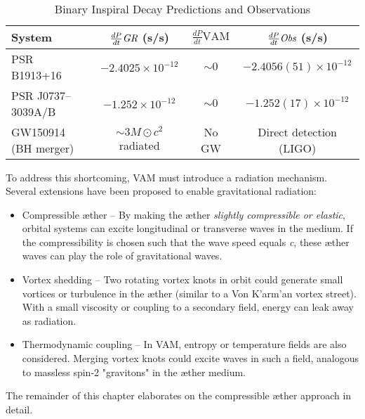 \begin{table}[h!]
\centering
\caption{Binary Inspiral Decay Predictions and Observations}
\label{tab:gw_comparison}
\begin{tabular}{lccc}
\toprule
System & $\frac{dP}{dt}\textit{\text{GR}}$ (s/s) & $\frac{dP}{dt}\text{VAM}$ & $\frac{dP}{dt}\textit{\text{Obs}}$ (s/s) \\
\midrule
PSR B1913+16 & $-2.4025\times10^{-12}$ & $\sim 0$ & $-2.4056(51)\times10^{-12}$ \\
PSR J0737--3039A/B & $-1.252\times10^{-12}$ & $\sim 0$ & $-1.252(17)\times10^{-12}$ \\
GW150914 (BH merger) & $\sim 3M\odot c^2$ radiated & No GW & Direct detection (LIGO) \\
\bottomrule
\end{tabular}
\end{table}

To address this shortcoming, VAM must introduce a radiation mechanism. Several extensions have been proposed to enable gravitational radiation:

\begin{itemize}
\item Compressible æther – By making the æther \textit{slightly compressible or elastic}, orbital systems can excite longitudinal or transverse waves in the medium. If the compressibility is chosen such that the wave speed equals \textit{c}, these æther waves can play the role of gravitational waves.
\item Vortex shedding – Two rotating vortex knots in orbit could generate small vortices or turbulence in the æther (similar to a Von K'arm'an vortex street). With a small viscosity or coupling to a secondary field, energy can leak away as radiation.
\item Thermodynamic coupling – In VAM, entropy or temperature fields are also considered. Merging vortex knots could excite waves in such a field, analogous to massless spin-2 "gravitons" in the æther medium.
\end{itemize}

The remainder of this chapter elaborates on the compressible æther approach in detail.

